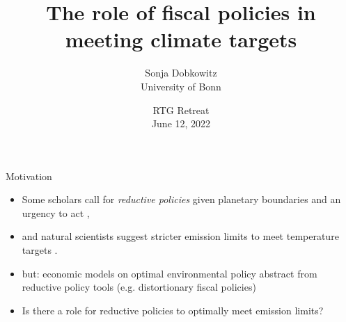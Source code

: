 \documentclass[11pt,aspectratio=169]{beamer}
\author[Sonja Dobkowitz]{\small Sonja Dobkowitz\\ \footnotesize{University of Bonn%
	}\\ }
\title{The role of fiscal policies in meeting climate targets}
\date{\small{RTG Retreat\\ June 12, 2022 }}
\begin{document}
	
	{
		\begin{frame}
		\titlepage
	\end{frame}
}



\addtocounter{framenumber}{-1}
\begin{frame}{Motivation}

\begin{itemize}[<+-| alert@+>]
	\item Some scholars call for \textit{reductive policies} given planetary boundaries and an urgency to act  \citep{Schor2005SustainableReduction, Arrow2004AreMuch, Dasgupta2021},
	\vspace{3mm}
	\item and natural scientists suggest stricter emission limits to meet temperature targets  \citep[e.g. IPPC reports ][]{Rogelj2018MitigationDevelopment., IPCC2022}.
	\vspace{3mm}
	\item but: economic models on optimal environmental policy abstract from reductive policy tools (e.g. distortionary fiscal policies)%
	\vspace{3mm}
\item Is there a role for reductive policies to optimally meet emission limits?
\end{itemize}
\end{frame}
\end{document}
